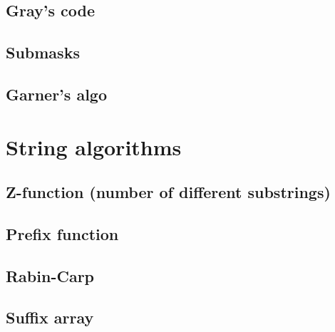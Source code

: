 \documentclass[12pt,a4paper]{article}
\begin{document}
\subsection{Gray's code}



\subsection{Submasks}



\subsection{Garner's algo}



\section{String algorithms}

\subsection{Z-function (number of different substrings)}



\subsection{Prefix function}



\subsection{Rabin-Carp}



\subsection{Suffix array}
\end{document}
